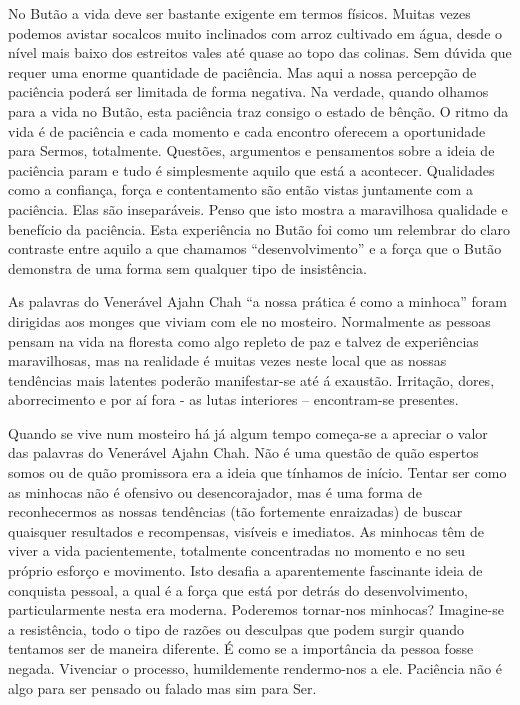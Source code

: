 No Butão a vida deve ser bastante exigente em termos físicos. Muitas
vezes podemos avistar socalcos muito inclinados com arroz cultivado em
água, desde o nível mais baixo dos estreitos vales até quase ao topo das
colinas. Sem dúvida que requer uma enorme quantidade de paciência. Mas
aqui a nossa percepção de paciência poderá ser limitada de forma
negativa. Na verdade, quando olhamos para a vida no Butão, esta
paciência traz consigo o estado de bênção. O ritmo da vida é de
paciência e cada momento e cada encontro oferecem a oportunidade para
Sermos, totalmente. Questões, argumentos e pensamentos sobre a ideia de
paciência param e tudo é simplesmente aquilo que está a acontecer.
Qualidades como a confiança, força e contentamento são então vistas
juntamente com a paciência. Elas são inseparáveis. Penso que isto mostra
a maravilhosa qualidade e benefício da paciência. Esta experiência no
Butão foi como um relembrar do claro contraste entre aquilo a que
chamamos ``desenvolvimento'' e a força que o Butão demonstra de uma
forma sem qualquer tipo de insistência.

As palavras do Venerável Ajahn Chah ``a nossa prática é como a minhoca''
foram dirigidas aos monges que viviam com ele no mosteiro. Normalmente
as pessoas pensam na vida na floresta como algo repleto de paz e talvez
de experiências maravilhosas, mas na realidade é muitas vezes neste
local que as nossas tendências mais latentes poderão manifestar-se até á
exaustão. Irritação, dores, aborrecimento e por aí fora - as lutas
interiores -- encontram-se presentes.

Quando se vive num mosteiro há já algum tempo começa-se a apreciar o
valor das palavras do Venerável Ajahn Chah. Não é uma questão de quão
espertos somos ou de quão promissora era a ideia que tínhamos de início.
Tentar ser como as minhocas não é ofensivo ou desencorajador, mas é uma
forma de reconhecermos as nossas tendências (tão fortemente enraizadas)
de buscar quaisquer resultados e recompensas, visíveis e imediatos. As
minhocas têm de viver a vida pacientemente, totalmente concentradas no
momento e no seu próprio esforço e movimento. Isto desafia a
aparentemente fascinante ideia de conquista pessoal, a qual é a força
que está por detrás do desenvolvimento, particularmente nesta era
moderna. Poderemos tornar-nos minhocas? Imagine-se a resistência, todo o
tipo de razões ou desculpas que podem surgir quando tentamos ser de
maneira diferente. É como se a importância da pessoa fosse negada.
Vivenciar o processo, humildemente rendermo-nos a ele. Paciência não é
algo para ser pensado ou falado mas sim para Ser.

